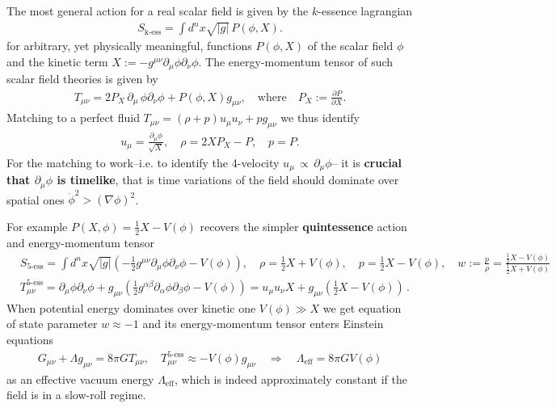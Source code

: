\documentclass[../geometry_main.tex]{subfiles}
\begin{document}
\begin{mytheorem}
%
The most general action for a real scalar field is given by the $k$-essence lagrangian 
\begin{align}
    S_{\text{k-ess}} = \int \!\!d^nx \sqrt{|g|} \,P(\phi,X).
\end{align}
for arbitrary, yet physically meaningful, functions $P(\phi,X)$ of the scalar field $\phi$ and the kinetic term $X:=-g^{\mu\nu} \partial_\mu \phi \partial_\nu \phi$.
The energy-momentum tensor of such scalar field theories is given by
\begin{align}
    T_{\mu\nu} = 2P_{X} \,\partial_\mu \,\phi \partial_\nu \phi +  P(\phi,X) g_{\mu\nu},\quad \text{where}\quad P_X := \frac{\partial P}{\partial X}.
\end{align}
Matching to a perfect fluid $T_{\mu\nu}=(\rho + p) u_\mu u_\nu + p g_{\mu\nu}$ we thus identify
\begin{align}
    u_{\mu}= \frac{\partial_\mu \phi}{\sqrt{X}},\quad \rho = 2X P_X - P,\quad p = P.
\end{align}
For the matching to work--i.e. to identify the 4-velocity $u_\mu \,\propto \,\partial_\mu \phi$-- it is \textbf{crucial that $\partial_\mu \phi$ is timelike}, that is time variations of the field should dominate over spatial ones $\dot{\phi}^2 > (\nabla \phi)^2$.

For example $P(X,\phi)=\tfrac{1}{2}X-V(\phi)$ recovers the simpler \textbf{quintessence} action and energy-momentum tensor
{\small
\begin{align}
    &S_{\text{5-ess}}=\int\!\! d^nx \sqrt{|g|} \left( -\frac{1}{2} g^{\mu\nu} \partial_\mu \phi \partial_\nu \phi - V(\phi) \right),\quad
    \rho = \tfrac{1}{2} X + V(\phi),\quad p = \tfrac{1}{2} X - V(\phi), \quad w:= \frac{p}{\rho} = \frac{\tfrac{1}{2}X - V(\phi)}{\tfrac{1}{2}X + V(\phi)}\\[4pt]
    &T^{\text{5-ess}}_{\mu\nu} = \partial_\mu \phi \partial_\nu \phi + g_{\mu\nu}\left( \tfrac{1}{2} g^{\alpha\beta} \partial_\alpha \phi \partial_\beta \phi  - V(\phi) \right) = u_\mu u_\nu X + g_{\mu\nu} \left( \tfrac{1}{2} X - V(\phi) \right)\,.
\end{align}
}
When potential energy dominates over kinetic one $V(\phi) \gg X$ we get equation of state parameter $w\approx -1$ and its energy-momentum tensor enters Einstein equations 
\begin{align}
    G_{\mu\nu} + \Lambda g_{\mu\nu} = 8\pi G T_{\mu\nu}, \quad T^{\text{5-ess}}_{\mu\nu} \approx - V(\phi) g_{\mu\nu} \quad \Rightarrow \quad \Lambda_\text{eff} = 8\pi G V(\phi)
\end{align}
as an effective vacuum energy $\Lambda_{\text{eff}}$, which is indeed approximately constant if the field is in a slow-roll regime.
%
\end{mytheorem}
\end{document}
